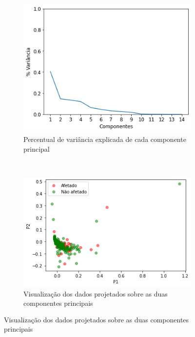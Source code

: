 \begin{figure}[htb] 
    \centering 
    \caption{PCA sobre dados mensais de CNAEs}
    \label{fig:resultados:base-de-dados-28-pca-components-monthly-cnae} 
    \begin{subfigure}[b]{0.45\textwidth}
        \includegraphics[scale=0.45]{images/base-de-dados-28.1-pca-components-monthly-cnae.png}
        \caption{Percentual de variância explicada de cada componente principal}
        \label{fig:resultados:base-de-dados-28.1-pca-components-monthly-cnae}
    \end{subfigure} ~ \quad
    \begin{subfigure}[b]{0.45\textwidth}
        \includegraphics[scale=0.45]{images/base-de-dados-28.2-pca-2d-monthly-cnae.png}
        \caption{Visualização dos dados projetados sobre as duas componentes principais}
        \label{fig:resultados:base-de-dados-28.2-pca-2d-monthly-cnae}
    \end{subfigure}
    \fdadospesquisa
\end{figure}

